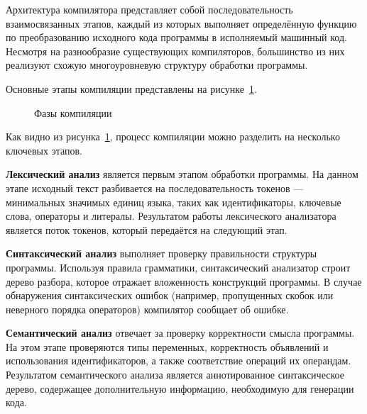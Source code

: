\documentclass[coursework]{SCWorks}
\begin{document}
Архитектура компилятора представляет собой последовательность взаимосвязанных этапов, 
каждый из которых выполняет определённую функцию по преобразованию исходного кода программы 
в исполняемый машинный код. Несмотря на разнообразие существующих компиляторов, 
большинство из них реализуют схожую многоуровневую структуру обработки программы.

Основные этапы компиляции представлены на рисунке~\ref{fig:compiler}.

\begin{figure}[h]
\centering
{}
\caption{Фазы компиляции}
\label{fig:compiler}
\end{figure}

Как видно из рисунка~\ref{fig:compiler}, процесс компиляции можно разделить на несколько ключевых этапов.

\textbf{Лексический анализ} является первым этапом обработки программы. 
На данном этапе исходный текст разбивается на последовательность токенов — минимальных значимых единиц языка, 
таких как идентификаторы, ключевые слова, операторы и литералы. 
Результатом работы лексического анализатора является поток токенов, 
который передаётся на следующий этап.

\textbf{Синтаксический анализ} выполняет проверку правильности структуры программы. 
Используя правила грамматики, синтаксический анализатор строит дерево разбора, 
которое отражает вложенность конструкций программы. 
В случае обнаружения синтаксических ошибок (например, пропущенных скобок или неверного порядка операторов) 
компилятор сообщает об ошибке.

\textbf{Семантический анализ} отвечает за проверку корректности смысла программы. 
На этом этапе проверяются типы переменных, корректность объявлений и использования идентификаторов, 
а также соответствие операций их операндам. 
Результатом семантического анализа является аннотированное синтаксическое дерево, 
содержащее дополнительную информацию, необходимую для генерации кода.
\end{document}
